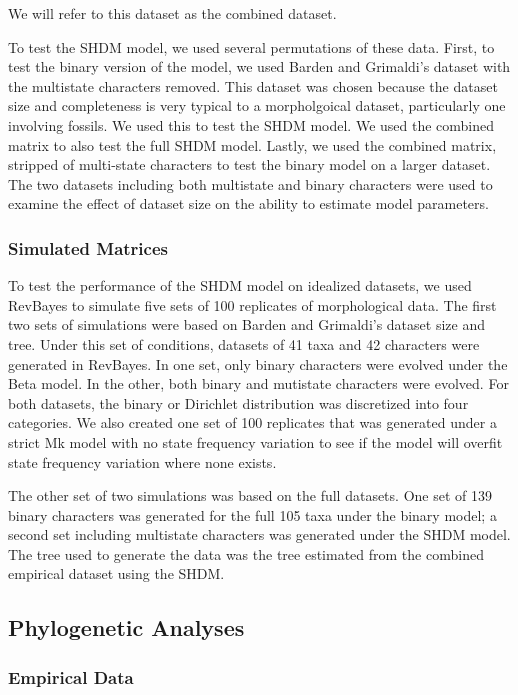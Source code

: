 \documentclass[]{article}
\begin{document}
We will refer to this dataset as the combined dataset. \par
To test the SHDM model, we used several permutations of these data.
First, to test the binary version of the model, we used Barden and Grimaldi's dataset with the multistate characters removed.
This dataset was chosen because the dataset size and completeness is very typical to a morpholgoical dataset, particularly one involving fossils.
We used this to test the SHDM model.
We used the combined matrix to also test the full SHDM model.
Lastly, we used the combined matrix, stripped of multi-state characters to test the binary model on a larger dataset.
The two datasets including both multistate and binary characters were used to examine the effect of dataset size on the ability to estimate model parameters. \par

\subsubsection{Simulated Matrices}

To test the performance of the SHDM model on idealized datasets, we used RevBayes to simulate five sets of 100 replicates of morphological data.
The first two sets of simulations were based on Barden and Grimaldi's dataset size and tree.
Under this set of conditions, datasets of 41 taxa and 42 characters were generated in RevBayes.
In one set, only binary characters were evolved under the Beta model.
In the other, both binary and mutistate characters were evolved.
For both datasets, the binary or Dirichlet distribution was discretized into four categories.
We also created one set of 100 replicates that was generated under a strict Mk model with no state frequency variation to see if the model will overfit state frequency variation where none exists.\par
The other set of two simulations was based on the full datasets.
One set of 139 binary characters was generated for the full 105 taxa under the binary model; a second set including multistate characters was generated under the SHDM model.
The tree used to generate the data was the tree estimated from the combined empirical dataset using the SHDM. \par

\subsection{Phylogenetic Analyses}
\subsubsection{Empirical Data}
\end{document}

